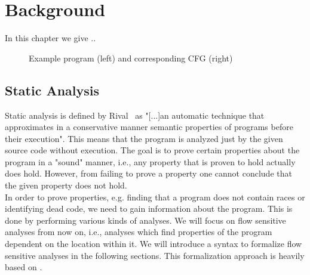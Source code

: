 
\chapter{Background}\label{chapter:background}
  In this chapter we give ..
  \parencite{cousot2021principles}

\begin{figure}
  \centering
  \begin{subfigure}{.35\textwidth}
    \centering
    
  \end{subfigure}
  \begin{subfigure}{.35\textwidth}
    \centering
  \end{subfigure}
  \caption{Example program (left) and corresponding CFG (right)}
  \label{fig:example_cfg}
\end{figure}

  \section{Static Analysis}
    Static analysis is defined by Rival~\parencite{rival2020introduction} as "[...]an automatic technique that approximates in a conservative manner semantic properties of programs before their execution". This means that the program is analyzed just by the given source code without execution. The goal is to prove certain properties about the program in a "sound" manner, i.e., any property that is proven to hold actually does hold. However, from failing to prove a property one cannot conclude that the given property does not hold.\\
    In order to prove properties, e.g. finding that a program does not contain races or identifying dead code, we need to gain information about the program. This is done by performing various kinds of analyses. We will focus on flow sensitive analyses from now on, i.e., analyses which find properties of the program dependent on the location within it. We will introduce a syntax to formalize flow sensitive analyses in the following sections. This formalization approach is heavily based on \parencite{apinis2012side}.
  
